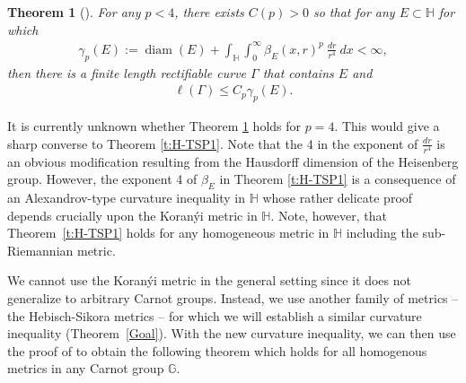 \documentclass[11pt]{amsart}
\newtheorem{theorem}{Theorem}
\def\diam{{\rm diam\,}}
\theoremstyle{definition}
\newcommand{\G}{\mathbb G}
\newcommand{\Heis}{\mathbb H}
\def\diam{\operatorname{diam}}
\numberwithin{theorem}{section} \numberwithin{equation}{section}
\begin{document}
\begin{theorem}[\cite{LiSchul2}] \label{t:H-TSP2}
  For any $p < 4$, there exists $C(p) > 0$ so that for any $E \subset \Heis$ for which
  \begin{align*}
    \gamma_p(E) := \diam(E) + \int_\Heis \int_0^\infty \beta_E(x,r)^p ~\frac{dr}{r^4} ~dx < \infty,
  \end{align*}
  then there is a finite length rectifiable curve $\Gamma$ that contains $E$ and
  \begin{align*}
    \ell(\Gamma) \leq C_p \gamma_p(E).
  \end{align*}
\end{theorem}
It is currently unknown whether Theorem \ref{t:H-TSP2} holds for $p = 4$. This would give a sharp converse to Theorem \ref{t:H-TSP1}.  Note that the 4 in the exponent of $\frac{dr}{r^4}$ is an obvious modification resulting from the Hausdorff dimension of the Heisenberg group. However, the exponent 4 of $\beta_E$ in Theorem \ref{t:H-TSP1} is a consequence of an Alexandrov-type curvature inequality in $\Heis$ whose rather delicate proof depends crucially upon the Koran\'yi metric in $\Heis$. Note, however, that Theorem~\ref{t:H-TSP1} holds for any homogeneous metric in $\Heis$ including the sub-Riemannian metric.

We cannot use the Koran\'yi metric in the general setting since it does not generalize to arbitrary Carnot groups.  Instead, we use another family of metrics -- the Hebisch-Sikora metrics \cite{HebSik} -- for which we will establish a similar curvature inequality (Theorem~\ref{Goal}).  With the new curvature inequality, we can then use the proof of \cite{LiSchul} to obtain the following theorem  which holds for all homogenous metrics in any Carnot group $\G$.

\end{document}
